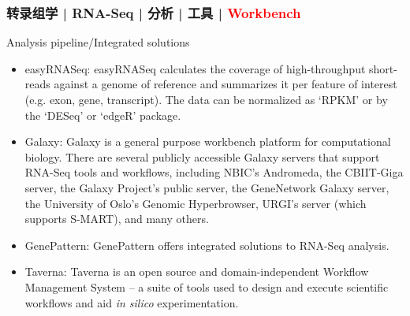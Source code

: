 \begin{frame}
  \frametitle{转录组学 | RNA-Seq | 分析 | 工具 | \textcolor{red}{Workbench}}
  {\footnotesize
  \begin{block}{Analysis pipeline/Integrated solutions}
    \begin{itemize}
      \item easyRNASeq: easyRNASeq calculates the coverage of high-throughput short-reads against a genome of reference and summarizes it per feature of interest (e.g. exon, gene, transcript). The data can be normalized as `RPKM' or by the `DESeq' or `edgeR' package.
      \item Galaxy: Galaxy is a general purpose workbench platform for computational biology. There are several publicly accessible Galaxy servers that support RNA-Seq tools and workflows, including NBIC's Andromeda, the CBIIT-Giga server, the Galaxy Project's public server, the GeneNetwork Galaxy server, the University of Oslo's Genomic Hyperbrowser, URGI's server (which supports S-MART), and many others.
      \item GenePattern: GenePattern offers integrated solutions to RNA-Seq analysis.
      \item Taverna: Taverna is an open source and domain-independent Workflow Management System – a suite of tools used to design and execute scientific workflows and aid \textit{in silico} experimentation.
    \end{itemize}
  \end{block}
  }
\end{frame}

